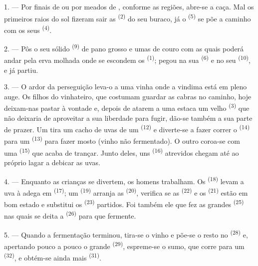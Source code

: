1. --- Por finais de  ou por meados de ,
conforme as regiões, abre-se a caça. Mal os primeiros raios do sol
fizeram sair as  \textsuperscript{(2)} do seu buraco, já o
 \textsuperscript{(5)} se põe a caminho com os seus 
\textsuperscript{(4)}.

2. --- Pôs o seu sólido  \textsuperscript{(9)} de pano grosso
e umas  de couro com as quais poderá andar pela erva
molhada onde se escondem os  \textsuperscript{(1)}; pegou na sua
 \textsuperscript{(6)} e no seu 
\textsuperscript{(10)}, e já partiu.

3. --- O ardor da perseguição leva-o a uma vinha onde a vindima está em
pleno auge. Os filhos do vinhateiro, que costumam guardar as cabras no
caminho, hoje deixam-nas pastar à vontade e, depois de atarem a uma
estaca um velho  \textsuperscript{(3)} que não deixaria de aproveitar
a sua liberdade para fugir, dão-se também a sua parte de prazer. Um tira
um cacho de uvas de um  \textsuperscript{(12)} e
diverte-se a fazer correr o  \textsuperscript{(14)} para um
 \textsuperscript{(13)} para fazer mosto (vinho não fermentado). O
outro coroa-se com uma  \textsuperscript{(15)} que
acaba de trançar. Junto deles, uns  \textsuperscript{(16)}
atrevidos chegam até ao próprio lagar a debicar as uvas.

4. --- Enquanto as crianças se divertem, os homens trabalham. Os
 \textsuperscript{(18)} levam a uva à adega em
 \textsuperscript{(17)}; um 
\textsuperscript{(19)} arranja as  \textsuperscript{(20)}, verifica se as
 \textsuperscript{(22)} e os  \textsuperscript{(21)} estão em
bom estado e substitui os  \textsuperscript{(23)} partidos. Foi
também ele que fez as grandes  \textsuperscript{(25)} nas quais se
deita a  \textsuperscript{(26)} para que fermente.

5. --- Quando a fermentação terminou, tira-se o vinho e põe-se o resto no
 \textsuperscript{(28)} e, apertando pouco a pouco o grande
 \textsuperscript{(29)}, espreme-se o sumo, que corre para um
 \textsuperscript{(32)}, e obtém-se ainda mais 
\textsuperscript{(31)}.

